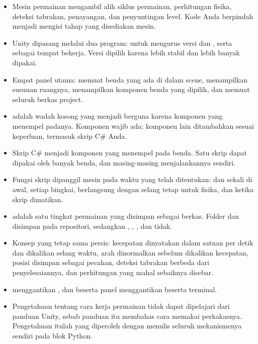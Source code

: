 
\begin{rangkumanbox}
\begin{itemize}
  \item Mesin permainan mengambil alih siklus permainan, perhitungan fisika,
        deteksi tabrakan, penayangan, dan penyuntingan level. Kode Anda
        berpindah menjadi mengisi tahap yang disediakan mesin.
  \item Unity dipasang melalui dua program:  untuk mengurus
        versi dan , serta  sebagai tempat
        bekerja. Versi  dipilih karena lebih stabil dan lebih
        banyak dipakai.
  \item Empat panel utama:  memuat benda yang ada di dalam
        scene,  menampilkan susunan ruangnya, 
        menampilkan komponen benda yang dipilih, dan 
        memuat seluruh berkas project.
  \item {} adalah wadah kosong yang menjadi berguna karena
        komponen yang menempel padanya. Komponen  wajib ada;
        komponen lain ditambahkan sesuai keperluan, termasuk skrip C\# Anda.
  \item Skrip C\# menjadi komponen yang menempel pada benda. Satu skrip dapat
        dipakai oleh banyak benda, dan masing-masing menjalankannya sendiri.
  \item Fungsi skrip dipanggil mesin pada waktu yang telah ditentukan:
         dan  sekali di awal,  setiap
        bingkai,  berlangsung dengan selang tetap untuk
        fisika, dan  ketika skrip dimatikan.
  \item {} adalah satu tingkat permainan yang disimpan sebagai
        berkas. Folder  dan  disimpan pada
        repositori, sedangkan , , , dan
         tidak.
  \item Konsep yang tetap sama persis: kecepatan dinyatakan dalam satuan per
        detik dan dikalikan selang waktu, arah dinormalkan sebelum dikalikan
        kecepatan, posisi disimpan sebagai pecahan, deteksi tabrakan berbeda
        dari penyelesaiannya, dan perhitungan yang mahal sebaiknya disebar.
  \item {} menggantikan , dan
         beserta panel  menggantikan
         beserta terminal.
  \item Pengetahuan tentang cara kerja permainan tidak dapat dipelajari dari
        panduan Unity, sebab panduan itu membahas cara memakai perkakasnya.
        Pengetahuan itulah yang diperoleh dengan menulis seluruh mekanismenya
        sendiri pada blok Python.
\end{itemize}
\end{rangkumanbox}

